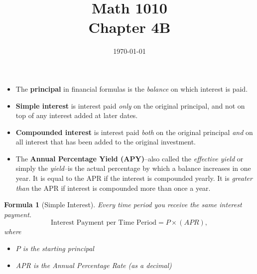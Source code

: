 \documentclass[12pt]{article}
\newtheorem{formula}[theorem]{Formula}
\begin{document}
\title{\bf Math 1010 \\ Chapter 4B\iftoggle{sol}{ Key}{} }
\date{\today}
\maketitle




\renewcommand{\theenumi}{\alph{enumi}}
\renewcommand{\labelenumi}{(\theenumi)}


\begin{itemize}
	\item The {\bf principal} in financial formulas is the \emph{balance} on which interest is paid.
	\item {\bf Simple interest} is interest paid \emph{only} on the original principal, and not on top of any interest added at later dates.
	\item {\bf Compounded interest} is interest paid \emph{both} on the original principal \emph{and} on all interest that has been added to the original investment.\item The {\bf Annual Percentage Yield (APY)}\---also called the \emph{effective yield} or simply the \emph{yield}\---is the actual percentage by which a balance increases in one year.  It is equal to the APR if the interest is compounded yearly.  It is {\it greater than} the APR if interest is compounded more than once a year.
\end{itemize}

\begin{formula}[Simple Interest]
	Every time period you receive the same interest payment.
	\begin{equation}\label{eq:simple}
		\text{Interest Payment per Time Period} = P\times(APR),
	\end{equation}
	where
	\begin{itemize}
		\item $P$ is the starting principal
		\item APR is the Annual Percentage Rate  (as a decimal)
	\end{itemize}
\end{formula}
\end{document}
